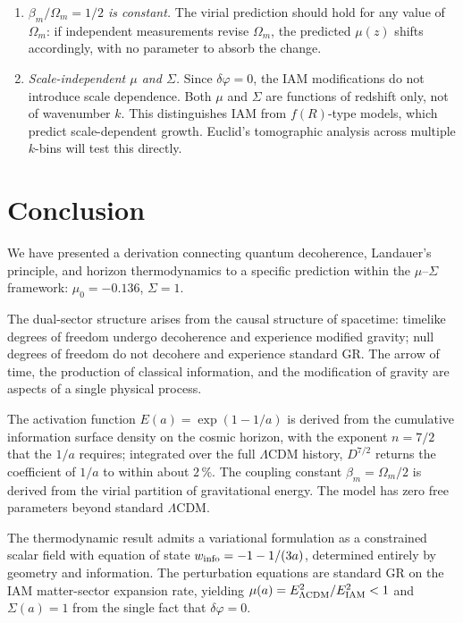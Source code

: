 \begin{enumerate}
(Chapter~\ref{ch:dsvalidation}); how far current measurements tighten it is the next step \openprob.
\item \emph{$\beta_m/\Omega_m=1/2$ is constant.} The virial prediction should hold for any value of $\Omega_m$: if independent measurements revise $\Omega_m$,
the predicted $\mu(z)$ shifts accordingly, with no parameter to absorb the change.
\item \emph{Scale-independent $\mu$ and $\Sigma$.} Since $\delta\varphi=0$, the IAM modifications do not introduce scale dependence. Both $\mu$ and $\Sigma$
are functions of redshift only, not of wavenumber $k$. This distinguishes IAM from $f(R)$-type models, which predict scale-dependent growth. Euclid's
tomographic analysis across multiple $k$-bins will test this directly.
\end{enumerate}

\section{Conclusion}\label{sec:th:conclusion}
We have presented a derivation connecting quantum decoherence, Landauer's principle, and horizon thermodynamics to a specific prediction within the
$\mu$--$\Sigma$ framework: $\mu_0=-0.136$, $\Sigma=1$.

The dual-sector structure arises from the causal structure of spacetime: timelike degrees of freedom undergo decoherence and experience modified
gravity; null degrees of freedom do not decohere and experience standard GR. The arrow of time, the production of classical information, and the
modification of gravity are aspects of a single physical process.

The activation function $E(a)=\exp(1-1/a)$ is derived from the cumulative information surface density on the cosmic horizon, with the exponent
$n=7/2$ that the $1/a$ requires; integrated over the full $\Lambda$CDM history, $D^{7/2}$ returns the coefficient of $1/a$ to within about $2\,\%$. The coupling
constant $\beta_m=\Omega_m/2$ is derived from the virial partition of gravitational energy. The model has zero free parameters beyond standard
$\Lambda$CDM.

The thermodynamic result admits a variational formulation as a constrained scalar field with equation of state $w_{\rm info}=-1-1/(3a)$, determined
entirely by geometry and information. The perturbation equations are standard GR on the IAM matter-sector expansion rate, yielding
$\mu(a)=E^2_{\Lambda\rm CDM}/E^2_{\rm IAM}<1$ and $\Sigma(a)=1$ from the single fact that $\delta\varphi=0$.


